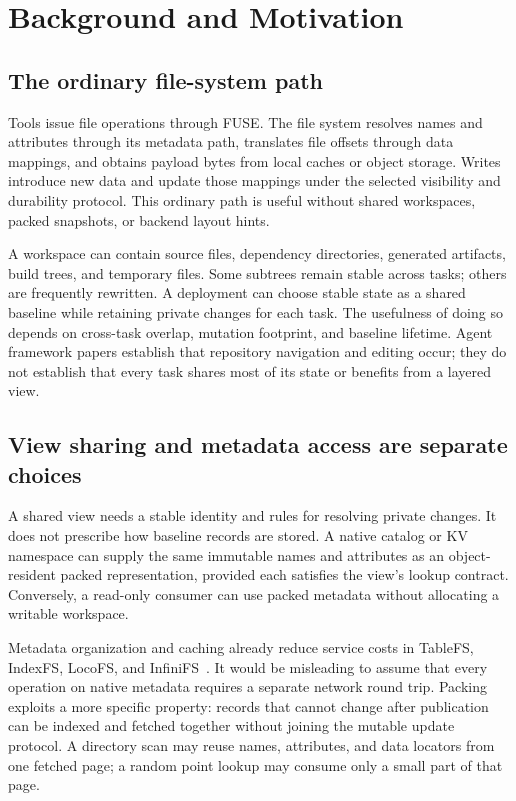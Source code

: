 \section{Background and Motivation}
\label{sec:motivation}

\subsection{The ordinary file-system path}

Tools issue file operations through FUSE. The file system resolves names and
attributes through its metadata path, translates file offsets through data
mappings, and obtains payload bytes from local caches or object storage.
Writes introduce new data and update those mappings under the selected
visibility and durability protocol. This ordinary path is useful without
shared workspaces, packed snapshots, or backend layout hints.

A workspace can contain source files, dependency directories, generated
artifacts, build trees, and temporary files. Some subtrees remain stable across
tasks; others are frequently rewritten. A deployment can choose stable state
as a shared baseline while retaining private changes for each task. The
usefulness of doing so depends on cross-task overlap, mutation footprint,
and baseline lifetime. Agent framework papers establish that repository
navigation and editing occur; they do not establish that every task shares
most of its state or benefits from a layered view.



\subsection{View sharing and metadata access are separate choices}

A shared view needs a stable identity and rules for resolving private changes.
It does not prescribe how baseline records are stored. A native catalog or
KV namespace can supply the same immutable names and attributes as an
object-resident packed representation, provided each satisfies the view's
lookup contract. Conversely, a read-only consumer can use packed metadata
without allocating a writable workspace.

Metadata organization and caching already reduce service costs in TableFS,
IndexFS, LocoFS, and InfiniFS~\cite{tablefs2013,indexfs2014,locofs2017,infinifs2022}.
It would be misleading to assume that every operation on native metadata
requires a separate network round trip. Packing exploits a more specific
property: records that cannot change after publication can be indexed and
fetched together without joining the mutable update protocol. A directory
scan may reuse names, attributes, and data locators from one fetched page;
a random point lookup may consume only a small part of that page.

